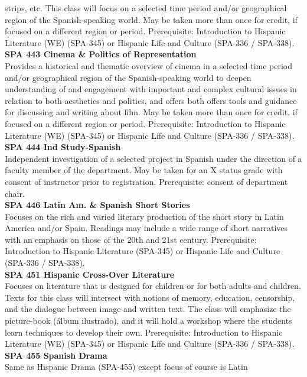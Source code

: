 \documentclass[
  letterpaper,
]{scrbook}
\begin{document}
strips, etc. This class will focus on a selected time period and/or
geographical region of the Spanish-speaking world. May be taken more
than once for credit, if focused on a different region or period.
Prerequisite: Introduction to Hispanic Literature (WE) (SPA-345) or
Hispanic Life and Culture (SPA-336 / SPA-338).\\
\textbf{SPA 443 Cinema \& Politics of Representation}\\
Provides a historical and thematic overview of cinema in a selected time
period and/or geographical region of the Spanish-speaking world to
deepen understanding of and engagement with important and complex
cultural issues in relation to both aesthetics and politics, and offers
both offers tools and guidance for discussing and writing about film.
May be taken more than once for credit, if focused on a different region
or period. Prerequisite: Introduction to Hispanic Literature (WE)
(SPA-345) or Hispanic Life and Culture (SPA-336 / SPA-338).\\
\textbf{SPA 444 Ind Study-Spanish}\\
Independent investigation of a selected project in Spanish under the
direction of a faculty member of the department. May be taken for an X
status grade with consent of instructor prior to registration.
Prerequisite: consent of department chair.\\
\textbf{SPA 446 Latin Am. \& Spanish Short Stories}\\
Focuses on the rich and varied literary production of the short story in
Latin America and/or Spain. Readings may include a wide range of short
narratives with an emphasis on those of the 20th and 21st century.
Prerequisite: Introduction to Hispanic Literature (SPA-345) or Hispanic
Life and Culture (SPA-336 / SPA-338).\\
\textbf{SPA 451 Hispanic Cross-Over Literature}\\
Focuses on literature that is designed for children or for both adults
and children. Texts for this class will intersect with notions of
memory, education, censorship, and the dialogue between image and
written text. The class will emphasize the picture-book (álbum
ilustrado), and it will hold a workshop where the students learn
techniques to develop their own. Prerequisite: Introduction to Hispanic
Literature (WE) (SPA-345) or Hispanic Life and Culture (SPA-336 /
SPA-338).\\
\textbf{SPA 455 Spanish Drama}\\
Same as Hispanic Drama (SPA-455) except focus of course is Latin
\end{document}
